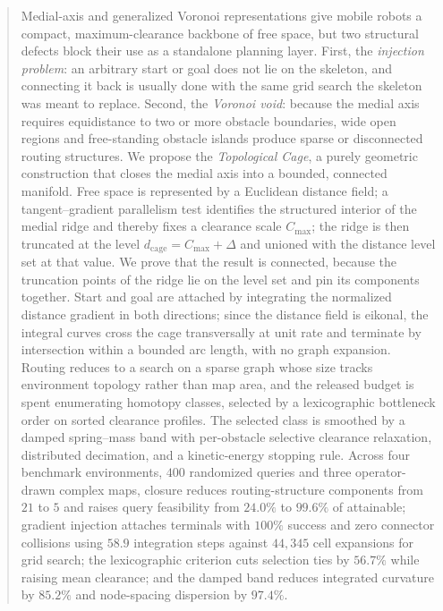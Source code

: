 \documentclass[conference]{IEEEtran}
\begin{document}
\begin{abstract}
Medial-axis and generalized Voronoi representations give mobile robots a compact, maximum-clearance backbone of free space, but two structural defects block their use as a standalone planning layer. First, the \emph{injection problem}: an arbitrary start or goal does not lie on the skeleton, and connecting it back is usually done with the same grid search the skeleton was meant to replace. Second, the \emph{Voronoi void}: because the medial axis requires equidistance to two or more obstacle boundaries, wide open regions and free-standing obstacle islands produce sparse or disconnected routing structures.
We propose the \emph{Topological Cage}, a purely geometric construction that closes the medial axis into a bounded, connected manifold. Free space is represented by a Euclidean distance field; a tangent--gradient parallelism test identifies the structured interior of the medial ridge and thereby fixes a clearance scale $C_{\max}$; the ridge is then truncated at the level $d_{\mathrm{cage}}=C_{\max}+\Delta$ and unioned with the distance level set at that value. We prove that the result is connected, because the truncation points of the ridge lie on the level set and pin its components together. Start and goal are attached by integrating the normalized distance gradient in both directions; since the distance field is eikonal, the integral curves cross the cage transversally at unit rate and terminate by intersection within a bounded arc length, with no graph expansion. Routing reduces to a search on a sparse graph whose size tracks environment topology rather than map area, and the released budget is spent enumerating homotopy classes, selected by a lexicographic bottleneck order on sorted clearance profiles. The selected class is smoothed by a damped spring--mass band with per-obstacle selective clearance relaxation, distributed decimation, and a kinetic-energy stopping rule. Across four benchmark environments, $400$ randomized queries and three operator-drawn complex maps, closure reduces routing-structure components from $21$ to $5$ and raises query feasibility from $24.0\%$ to $99.6\%$ of attainable; gradient injection attaches terminals with $100\%$ success and zero connector collisions using $58.9$ integration steps against $44{,}345$ cell expansions for grid search; the lexicographic criterion cuts selection ties by $56.7\%$ while raising mean clearance; and the damped band reduces integrated curvature by $85.2\%$ and node-spacing dispersion by $97.4\%$.
\end{abstract}
\end{document}
